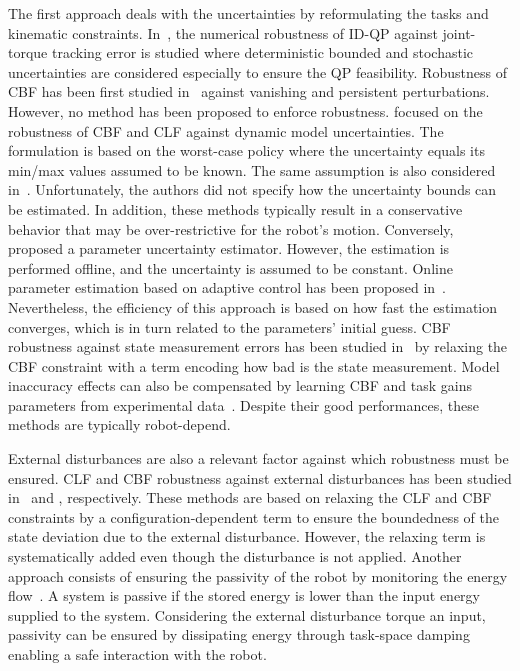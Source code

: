The first approach deals with the uncertainties by reformulating the tasks and kinematic constraints. In~\cite{delprete2016tro}, the numerical robustness of ID-QP against joint-torque tracking error is studied where deterministic bounded and stochastic uncertainties are considered especially to ensure the QP feasibility. Robustness of CBF has been first studied in~\cite{xu2015ifac} against vanishing and persistent perturbations. However, no method has been proposed to enforce robustness.  \cite{nguyen2016acc2} focused on the robustness of CBF and CLF against dynamic model uncertainties. The formulation is based on the worst-case policy where the uncertainty equals its min/max values assumed to be known. The same assumption is also considered in~\cite{jankovic2018automatica}. Unfortunately, the authors did not specify how the uncertainty bounds can be estimated. In addition, these methods typically result in a conservative behavior that may be over-restrictive for the robot's motion. 
Conversely,~\cite{takano2020jcmsi} proposed a parameter uncertainty estimator. However, the estimation is performed offline, and the uncertainty is assumed to be constant. Online parameter estimation based on adaptive control has been proposed in~\cite{taylor2020acc}. Nevertheless, the efficiency of this approach is based on how fast the estimation converges, which is in turn related to the parameters' initial guess. CBF robustness against state measurement errors has been studied in~\cite{cosner2021iros,dean2020arxiv} by relaxing the CBF constraint with a term encoding how bad is the state measurement. Model inaccuracy effects can also be compensated by learning CBF and task gains parameters from experimental data~\cite{taylor2019iros,taylor2020cldc,wang2021ecc,penco2020ral,dai2022arxiv,csomayshanklin2021arxiv}. Despite their good performances, these methods are typically robot-depend.

External disturbances are also a relevant factor against which robustness must be ensured. CLF and CBF robustness against external disturbances has been studied in~\cite{kolathaya2018acc} and \cite{kolathaya2019csl,alan2022csl}, respectively. These methods are based on relaxing the CLF and CBF constraints by a configuration-dependent term to ensure the boundedness of the state deviation due to the external disturbance. However, the relaxing term is systematically added even though the disturbance is not applied. Another approach consists of ensuring the passivity of the robot by monitoring the energy flow~\cite{stramigioli2015springer}. A system is passive if the stored energy is lower than the input energy supplied to the system. Considering the external disturbance torque an input, passivity can be ensured by dissipating energy through task-space damping~\cite{dietrich2016ral,dietrich2017ral} enabling a safe interaction with the robot.

